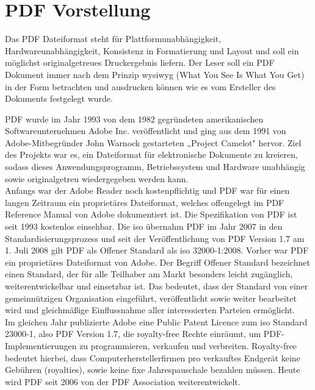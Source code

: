 \section{PDF Vorstellung}
Das PDF Dateiformat steht für Plattformunabhängigkeit, Hardwareunabhängigkeit, Konsistenz in Formatierung und Layout und soll ein möglichst originalgetreues Druckergebnis liefern. Der Leser soll ein PDF Dokument immer nach dem Prinzip \gls{wysiwyg} (What You See Is What You Get) in der Form betrachten und ausdrucken können wie es vom Ersteller des Dokuments festgelegt wurde.
\par
PDF wurde im Jahr 1993 von dem 1982 gegründeten amerikanischen Softwareunternehmen Adobe Inc. veröffentlicht und ging aus dem 1991 von Adobe-Mitbegründer John Warnock gestarteten „Project Camelot" hervor. \cite{wiki-adobe, wiki-pdf-de} Ziel des Projekts war es, ein Dateiformat für elektronische Dokumente zu kreieren, sodass dieses Anwendungsprogramm, Betriebssystem und Hardware unabhängig sowie originalgetreu wiedergegeben werden kann. \\
Anfangs war der Adobe Reader noch kostenpflichtig und PDF war für einen langen Zeitraum ein proprietäres Dateiformat, welches offengelegt im PDF Reference Manual von Adobe dokumentiert ist. Die Spezifikation von PDF ist seit 1993 kostenlos einsehbar. \cite{wiki-pdf-engl} Die \gls{iso} übernahm PDF im Jahr 2007 in den Standardisierungsprozess und seit der Veröffentlichung von PDF Version 1.7 am 1. Juli 2008 gilt PDF als Offener Standard als \gls{iso} 32000-1:2008. \cite{wiki-pdf-de, wiki-pdf-engl} Vorher war PDF ein proprietäres Dateiformat von Adobe. Der Begriff Offener Standard bezeichnet einen Standard, der für alle Teilhaber am Markt besonders leicht zugänglich, weiterentwickelbar und einsetzbar ist. Das bedeutet, dass der Standard von einer gemeinnützigen Organisation eingeführt, veröffentlicht sowie weiter bearbeitet wird und gleichmäßige Einflussnahme aller interessierten Parteien ermöglicht. \cite{wiki-standard} \\
Im gleichen Jahr publizierte Adobe eine Public Patent Licence zum \gls{iso} Standard 23000-1, also PDF Version 1.7, die royalty-free Rechte einräumt, um PDF-Implementierungen zu programmieren, verkaufen und verbreiten. \cite{wiki-pdf-engl} Royalty-free bedeutet hierbei, dass Computerherstellerfirmen pro verkauftes Endgerät keine Gebühren (royalties), sowie keine fixe Jahrespauschale bezahlen müssen. \cite{wiki-roy-free} Heute wird PDF seit 2006 von der PDF Association weiterentwickelt. \cite{wiki-pdf-de}

